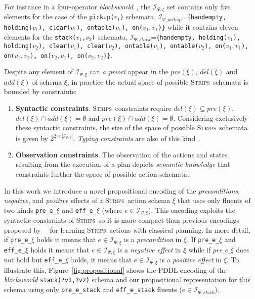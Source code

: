 \documentclass{article}
\newcommand{\strips}{\textsc{Strips}}
\begin{document}
For instance in a four-operator {\em blocksworld}~\cite{slaney2001blocks}, the ${\mathcal I}_{\Psi,\xi}$ set contains only five elements for the case of the {\small \tt pickup($v_1$)} schemata, ${\mathcal I}_{\Psi,pickup}$={\small\tt\{handempty, holding($v_1$), clear($v_1$), ontable($v_1$), on($v_1,v_1$)\}} while it contains eleven elements for the {\small \tt stack($v_1$,$v_2$)} schemata, ${\mathcal I}_{\Psi,stack}$={\small\tt\{handempty, holding($v_1$), holding($v_2$), clear($v_1$), clear($v_2$), ontable($v_1$), ontable($v_2$), on($v_1,v_1$), on($v_1,v_2$), on($v_2,v_1$), on($v_2,v_2$)\}}. 

Despite any element of ${\mathcal I}_{\Psi,\xi}$ can {\em a priori} appear in the $pre(\xi)$, $del(\xi)$ and $add(\xi)$ of schema $\xi$, in practice the actual space of possible \strips\ schemata is bounded by constraints:
\begin{enumerate}
\item {\bf Syntactic constraints}. \strips\ constraints require $del(\xi)\subseteq pre(\xi)$, $del(\xi)\cap add(\xi)=\emptyset$ and $pre(\xi)\cap add(\xi)=\emptyset$. Considering exclusively these syntactic constraints, the size of the space of possible \strips\ schemata is given by $2^{2\times|{\mathcal I}_{\Psi,\xi}|}$. {\em Typing constraints} are also of this kind~\cite{mcdermott1998pddl}. 
\item {\bf Observation constraints}. The observation of the actions and states resulting from the execution of a plan depicts {\em semantic knowledge} that constraints further the space of possible action schemata.   
\end{enumerate}

In this work we introduce a novel propositional encoding of the {\em preconditions}, {\em negative}, and {\em positive} effects of a \strips\ action schema $\xi$ that uses only fluents of two kinds {\tt\small pre\_e\_$\xi$} and {\tt\small eff\_e\_$\xi$} (where $e\in{\mathcal I}_{\Psi,\xi}$). This encoding exploits the syntactic constraints of \strips\, so it is more compact than previous encodings proposed by~\citeauthor{aineto2018learning}~\citeyear{aineto2018learning} for learning \strips\ actions with classical planning. In more detail, if {\tt\small pre\_e\_$\xi$} holds it means that $e\in{\mathcal I}_{\Psi,\xi}$ is a {\em precondition} in $\xi$. If {\tt\small pre\_e\_$\xi$} and {\tt\small eff\_e\_$\xi$} holds it means that $e\in{\mathcal I}_{\Psi,\xi}$ is a {\em negative effect} in $\xi$ while if $pre\_e\_\xi$ does not hold but {\tt\small eff\_e\_$\xi$} holds, it means that $e\in{\mathcal I}_{\Psi,\xi}$ is a {\em positive effect} in $\xi$. To illustrate this, Figure~\ref{fig:propositional} shows the PDDL encoding of the {\em blocksworld} {\tt\small stack(?v1,?v2)} schema and our propositional representation for this schema using only {\tt\small pre\_e\_stack} and {\tt\small eff\_e\_stack} fluents ($e\in{\mathcal I}_{\Psi,stack}$).
\end{document}
